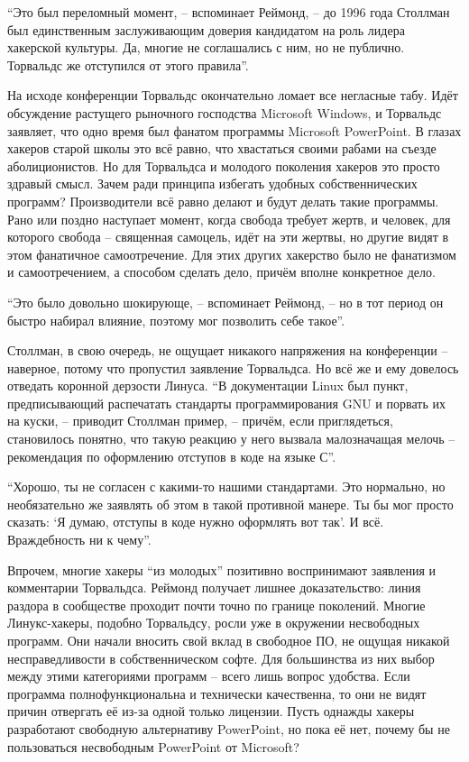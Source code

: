 \enquote{Это был переломный момент, -- вспоминает Реймонд, -- до 1996 года Столлман был единственным заслуживающим доверия кандидатом на роль лидера хакерской культуры. Да, многие не соглашались с ним, но не публично. Торвальдс же отступился от этого правила}.

На исходе конференции Торвальдс окончательно ломает все негласные табу. Идёт обсуждение растущего рыночного господства Microsoft Windows, и Торвальдс заявляет, что одно время был фанатом программы Microsoft PowerPoint. В глазах хакеров старой школы это всё равно, что хвастаться своими рабами на съезде аболиционистов. Но для Торвальдса и молодого поколения хакеров это просто здравый смысл. Зачем ради принципа избегать удобных собственнических программ? Производители всё равно делают и будут делать такие программы. Рано или поздно наступает момент, когда свобода требует жертв, и человек, для которого свобода -- священная самоцель, идёт на эти жертвы, но другие видят в этом фанатичное самоотречение. Для этих других хакерство было не фанатизмом и самоотречением, а способом сделать дело, причём вполне конкретное дело.

\enquote{Это было довольно шокирующе, -- вспоминает Реймонд, -- но в тот период он быстро набирал влияние, поэтому мог позволить себе такое}.

Столлман, в свою очередь, не ощущает никакого напряжения на конференции -- наверное, потому что пропустил заявление Торвальдса. Но всё же и ему довелось отведать коронной дерзости Линуса. \enquote{В документации Linux был пункт, предписывающий распечатать стандарты программирования GNU и порвать их на куски, -- приводит Столлман пример, -- причём, если приглядеться, становилось понятно, что такую реакцию у него вызвала малозначащая мелочь -- рекомендация по оформлению отступов в коде на языке С}.

\enquote{Хорошо, ты не согласен с какими-то нашими стандартами. Это нормально, но необязательно же заявлять об этом в такой противной манере. Ты бы мог просто сказать: \enquote{Я думаю, отступы в коде нужно оформлять вот так}. И всё. Враждебность ни к чему}.

Впрочем, многие хакеры \enquote{из молодых} позитивно воспринимают заявления и комментарии Торвальдса. Реймонд получает лишнее доказательство: линия раздора в сообществе проходит почти точно по границе поколений. Многие Линукс-хакеры, подобно Торвальдсу, росли уже в окружении несвободных программ. Они начали вносить свой вклад в свободное ПО, не ощущая никакой несправедливости в собственническом софте. Для большинства из них выбор между этими категориями программ -- всего лишь вопрос удобства. Если программа полнофункциональна и технически качественна, то они не видят причин отвергать её из-за одной только лицензии. Пусть однажды хакеры разработают свободную альтернативу PowerPoint, но пока её нет, почему бы не пользоваться несвободным PowerPoint от Microsoft?

